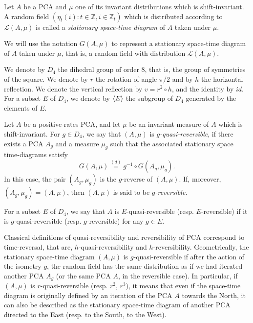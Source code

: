 \documentclass[AHL,Unicode,longabstracts]{cedram}
\DeclarePairedDelimiter{\vect}{\langle}{\rangle}
\newcounter{a}
\newcommand{\eqd}{\stackrel{(d)}{=}}
\newcommand{\ZZ}{\mathbb{Z}}
\renewcommand{\L}{\mathcal{L}}
\begin{document}
\begin{defi}\label{def:std}
Let $A$ be a PCA and $\mu$ one of its invariant distributions which is shift-invariant. A random field $(\eta_t(i) : t \in \ZZ, i \in \ZZ_t)$ which is distributed according to $\L(A,\mu)$ is called a \emph{stationary space-time diagram} of $A$ taken under $\mu$.
\end{defi}

We will use the notation $G(A,\mu)$ to represent a stationary space-time diagram of $A$ taken under $\mu$, that is, a random field with distribution $\L(A,\mu)$.

We denote by $D_4$ the dihedral group of order $8$, that is, the group of symmetries of the square. We denote by $r$ the rotation of angle $\pi/2$ and by $h$ the horizontal reflection. We denote the vertical reflection by $v=r^2\circ h$, and the identity by $id$. For a subset $E$ of $D_4$, we denote by $\vect{E}$ the subgroup of $D_4$ generated by the elements of $E$.

\begin{defi}\label{def:rev}
Let $A$ be a positive-rates PCA, and let $\mu$ be an invariant measure of $A$ which is shift-invariant. For $g \in D_4$, we say that $(A,\mu)$ is \emph{$g$-quasi-reversible}, if there exists a PCA $A_g$ and a measure $\mu_g$ such that the associated stationary space time-diagrams satisfy
\[
{G(A,\mu) \eqd g^{-1} \circ G(A_g,\mu_g)}.
\]
In this case, the pair $(A_g,\mu_g)$ is the $g$-reverse of $(A,\mu)$. If, moreover, $(A_g,\mu_g)=(A,\mu)$, then $(A,\mu)$ is said to be \emph{$g$-reversible}.

For a subset $E$ of $D_4$, we say that $A$ is $E$-quasi-reversible (resp. $E$-reversible) if it is $g$-quasi-reversible (resp. $g$-reversible) for any $g\in E$.
\end{defi}

Classical definitions of quasi-reversibility and reversibility of PCA correspond to time-reversal, that are, $h$-quasi-reversibility and $h$-reversibility. Geometrically, the stationary space-time diagram $(A,\mu)$ is $g$-quasi-reversible if after the action of the isometry $g$, the random field has the same distribution as if we had iterated another PCA $A_g$ (or the same PCA $A$, in the reversible case). In particular, if $(A,\mu)$ is $r$-quasi-reversible (resp. $r^2$, $r^3$), it means that even if the space-time diagram is originally defined by an iteration of the PCA $A$ towards the North, it can also be described as the stationary space-time diagram of another PCA directed to the East (resp. to the South, to the West).
\end{document}
